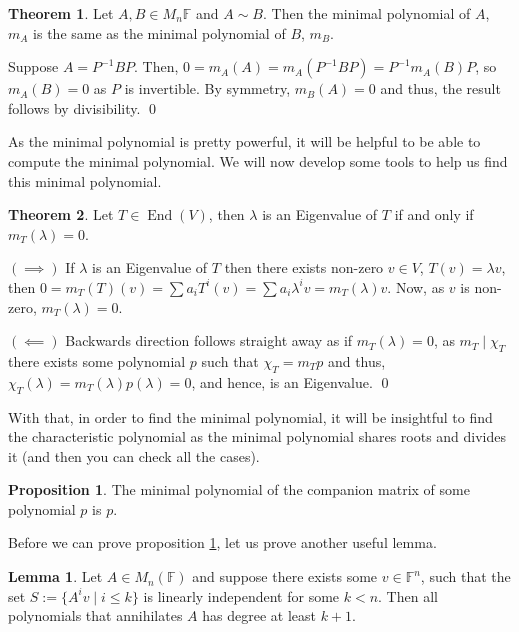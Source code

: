 \documentclass[
]{article}
\theoremstyle{definition}
\newtheorem{theorem}{Theorem}
\newtheorem{prop}{Proposition}[section]
\newtheorem{lemma}{Lemma}[section]
\theoremstyle{definition}
\begin{document}
\begin{theorem}
  Let \(A, B \in M_n{\mathbb{F}}\) and \(A \sim B\). Then the minimal polynomial 
  of \(A\), \(m_A\) is the same as the minimal polynomial of \(B\), \(m_B\).
\end{theorem}
\proof

Suppose \(A = P^{-1} B P\). Then,
\(0 = m_A(A) = m_A(P^{-1}BP) = P^{-1} m_A(B) P\), so \(m_A(B) = 0\) as
\(P\) is invertible. By symmetry, \(m_B(A) = 0\) and thus, the result
follows by divisibility. \qed

As the minimal polynomial is pretty powerful, it will be helpful to be
able to compute the minimal polynomial. We will now develop some tools
to help us find this minimal polynomial.

\begin{theorem}
  Let \(T \in \mathop{\mathrm{End}}(V)\), then \(\lambda\) is an Eigenvalue of \(T\) if and only 
  if \(m_T(\lambda) = 0\).
\end{theorem}
\proof

\((\implies)\) If \(\lambda\) is an Eigenvalue of \(T\) then there
exists non-zero \(v \in V\), \(T(v) = \lambda v\), then
\(0 = m_T(T)(v) = \sum a_i T^i(v) = \sum a_i \lambda^i v = m_T(\lambda)v\).
Now, as \(v\) is non-zero, \(m_T(\lambda) = 0\).

\((\impliedby)\) Backwards direction follows straight away as if
\(m_T(\lambda) = 0\), as \(m_T \mid \chi_T\) there exists some
polynomial \(p\) such that \(\chi_T = m_T p\) and thus,
\(\chi_T(\lambda)  = m_T(\lambda)p(\lambda) = 0\), and hence, is an
Eigenvalue. \qed

With that, in order to find the minimal polynomial, it will be
insightful to find the characteristic polynomial as the minimal
polynomial shares roots and divides it (and then you can check all the
cases).

\begin{prop}\label{comp_min}
  The minimal polynomial of the companion matrix of some polynomial \(p\) is \(p\).
\end{prop}

Before we can prove proposition \ref{comp_min}, let us prove another
useful lemma.

\begin{lemma}
  Let \(A \in M_n(\mathbb{F})\) and suppose there exists some \(v \in \mathbb{F}^n\),
  such that the set \(S := \{A^i v \mid i \le k \}\) is linearly independent for 
  some \(k < n\). Then all polynomials that annihilates \(A\) has degree at 
  least \(k + 1\).
\end{lemma}
\proof
\end{document}
